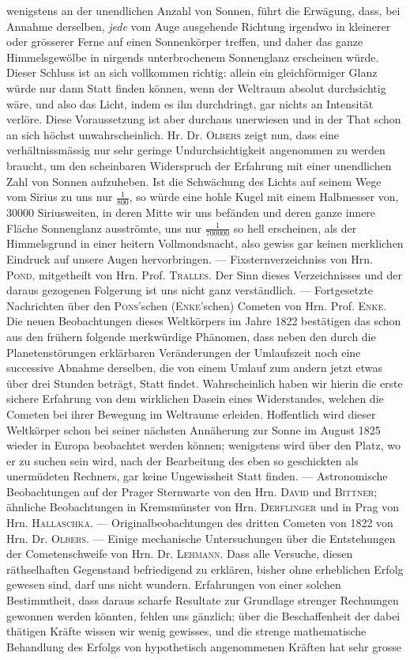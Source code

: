 wenigstens an der unendlichen Anzahl von Sonnen, führt die Erwägung, dass, bei Annahme derselben, \emph{jede} vom Auge ausgehende Richtung irgendwo in kleinerer oder grösserer Ferne auf einen Sonnenkörper treffen, und daher das ganze Himmelsgewölbe in nirgends unterbrochenem Sonnenglanz erscheinen würde. Dieser Schluss ist an sich vollkommen richtig: allein ein gleichförmiger Glanz würde nur dann Statt finden können, wenn der Weltraum absolut durchsichtig wäre, und also das Licht, indem es ihn durchdringt, gar nichts an Intensität verlöre. Diese Voraussetzung ist aber durchaus unerwiesen und in der That schon an sich höchst unwahrscheinlich. Hr. Dr. \textsc{Olbers} zeigt nun, dass eine  verhältnissmässig nur sehr geringe Undurchsichtigkeit angenommen zu werden braucht, um den scheinbaren Widerspruch der Erfahrung mit einer unendlichen Zahl von Sonnen aufzuheben. Ist die Schwächung des Lichts auf seinem Wege vom Sirius zu uns nur $\frac{1}{800}$, so würde eine hohle Kugel mit einem Halbmesser von, 30000 Siriusweiten, in deren Mitte wir uns befänden und deren ganze innere Fläche Sonnenglanz ausströmte, uns nur $\frac{1}{700000}$ so hell erscheinen, als der Himmelsgrund in einer heitern Vollmondsnacht, also gewiss gar keinen merklichen Eindruck auf unsere Augen hervorbringen. --- Fixsternverzeichniss von Hrn. \textsc{Pond}, mitgetheilt von Hrn. Prof. \textsc{Tralles}. Der Sinn dieses Verzeichnisses und der daraus gezogenen Folgerung ist uns nicht ganz verständlich. --- Fortgesetzte Nachrichten über den \textsc{Pons}'schen (\textsc{Enke}'schen) Cometen von Hrn. Prof. \textsc{Enke}. Die neuen Beobachtungen dieses Weltkörpers im Jahre 1822 bestätigen das schon aus den frühern folgende merkwürdige Phänomen, dass neben den durch die Planetenstörungen erklärbaren Veränderungen der Umlaufszeit noch eine successive Abnahme derselben, die von einem Umlauf zum andern jetzt etwas über drei Stunden beträgt, Statt findet. Wahrscheinlich haben wir hierin die erste sichere Erfahrung von dem wirklichen Dasein eines Widerstandes, welchen die Cometen bei ihrer Bewegung im Weltraume erleiden. Hoffentlich wird dieser Weltkörper schon bei seiner nächsten Annäherung zur Sonne im August 1825 wieder in Europa beobachtet werden können; wenigstens wird über den Platz, wo er zu suchen sein wird, nach der Bearbeitung des eben so geschickten als unermüdeten Rechners, gar keine Ungewissheit Statt finden. --- Astronomische Beobachtungen auf der Prager Sternwarte von den Hrn. \textsc{David} und \textsc{Bittner}; ähnliche Beobachtungen in Kremsmünster von Hrn. \textsc{Derflinger} und in Prag von Hrn. \textsc{Hallaschka}. --- Originalbeobachtungen des dritten Cometen von 1822 von Hrn. Dr. \textsc{Olbers}. --- Einige mechanische Untersuchungen über die Entstehungen der Cometenschweife von Hrn. Dr. \textsc{Lehmann}. Dass alle Versuche, diesen räthselhaften Gegenstand befriedigend zu erklären, bisher ohne erheblichen Erfolg gewesen sind, darf uns nicht wundern. Erfahrungen von einer solchen Bestimmtheit, dass daraus scharfe Resultate zur Grundlage strenger Rechnungen gewonnen werden könnten, fehlen uns gänzlich; über die Beschaffenheit der dabei thätigen Kräfte wissen wir wenig gewisses, und die strenge mathematische Behandlung des Erfolgs von hypothetisch angenommenen Kräften hat sehr grosse 
